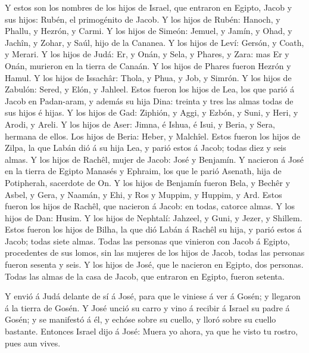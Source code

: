  Y estos son los nombres de los hijos de Israel, que
entraron en Egipto, Jacob y sus hijos: Rubén, el primogénito de Jacob.
 Y los hijos de Rubén: Hanoch, y Phallu, y Hezrón, y Carmi.
 Y los hijos de Simeón: Jemuel, y Jamín, y Ohad, y Jachîn,
y Zohar, y Saúl, hijo de la Cananea.  Y los hijos de Leví:
Gersón, y Coath, y Merari.  Y los hijos de Judá: Er, y
Onán, y Sela, y Phares, y Zara: mas Er y Onán, murieron en la tierra de
Canaán. Y los hijos de Phares fueron Hezrón y Hamul.  Y los
hijos de Issachâr: Thola, y Phua, y Job, y Simrón.  Y los
hijos de Zabulón: Sered, y Elón, y Jahleel.  Estos fueron
los hijos de Lea, los que parió á Jacob en Padan-aram, y además su hija
Dina: treinta y tres las almas todas de sus hijos é hijas. 
Y los hijos de Gad: Ziphión, y Aggi, y Ezbón, y Suni, y Heri, y Arodi, y
Areli.  Y los hijos de Aser: Jimna, é Ishua, é Isui, y
Beria, y Sera, hermana de ellos. Los hijos de Beria: Heber, y Malchîel.
 Estos fueron los hijos de Zilpa, la que Labán dió á su
hija Lea, y parió estos á Jacob; todas diez y seis almas. 
Y los hijos de Rachêl, mujer de Jacob: José y Benjamín.  Y
nacieron á José en la tierra de Egipto Manasés y Ephraim, los que le
parió Asenath, hija de Potipherah, sacerdote de On.  Y los
hijos de Benjamín fueron Bela, y Bechêr y Asbel, y Gera, y Naamán, y
Ehi, y Ros y Muppim, y Huppim, y Ard.  Estos fueron los
hijos de Rachêl, que nacieron á Jacob: en todas, catorce almas.
 Y los hijos de Dan: Husim.  Y los hijos de
Nephtalí: Jahzeel, y Guni, y Jezer, y Shillem.  Estos
fueron los hijos de Bilha, la que dió Labán á Rachêl su hija, y parió
estos á Jacob; todas siete almas.  Todas las personas que
vinieron con Jacob á Egipto, procedentes de sus lomos, sin las mujeres
de los hijos de Jacob, todas las personas fueron sesenta y seis.
 Y los hijos de José, que le nacieron en Egipto, dos
personas. Todas las almas de la casa de Jacob, que entraron en Egipto,
fueron setenta.

 Y envió á Judá delante de sí á José, para que le viniese á
ver á Gosén; y llegaron á la tierra de Gosén.  Y José unció
su carro y vino á recibir á Israel su padre á Gosén; y se manifestó á
él, y echóse sobre su cuello, y lloró sobre su cuello bastante.
 Entonces Israel dijo á José: Muera yo ahora, ya que he
visto tu rostro, pues aun vives.

